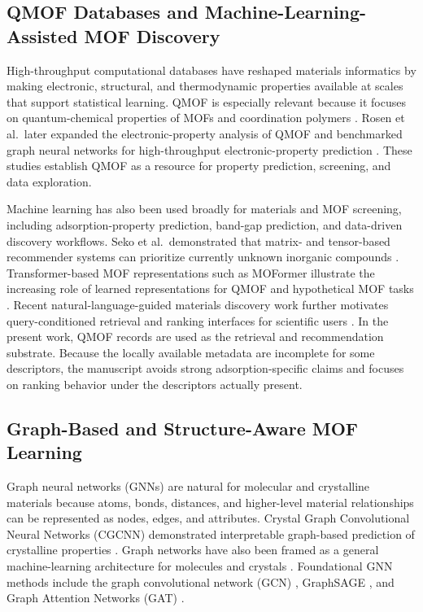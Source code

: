 \documentclass[12pt,a4paper]{article}
\begin{document}
\subsection{QMOF Databases and Machine-Learning-Assisted MOF Discovery}

High-throughput computational databases have reshaped materials informatics by making electronic, structural, and thermodynamic properties available at scales that support statistical learning. QMOF is especially relevant because it focuses on quantum-chemical properties of MOFs and coordination polymers \cite{rosen2021}. Rosen et al.\ later expanded the electronic-property analysis of QMOF and benchmarked graph neural networks for high-throughput electronic-property prediction \cite{rosen2022}. These studies establish QMOF as a resource for property prediction, screening, and data exploration.

Machine learning has also been used broadly for materials and MOF screening, including adsorption-property prediction, band-gap prediction, and data-driven discovery workflows. Seko et al.\ demonstrated that matrix- and tensor-based recommender systems can prioritize currently unknown inorganic compounds \cite{seko2018}. Transformer-based MOF representations such as MOFormer illustrate the increasing role of learned representations for QMOF and hypothetical MOF tasks \cite{luo2023}. Recent natural-language-guided materials discovery work further motivates query-conditioned retrieval and ranking interfaces for scientific users \cite{qu2023}. In the present work, QMOF records are used as the retrieval and recommendation substrate. Because the locally available metadata are incomplete for some descriptors, the manuscript avoids strong adsorption-specific claims and focuses on ranking behavior under the descriptors actually present.

\subsection{Graph-Based and Structure-Aware MOF Learning}

Graph neural networks (GNNs) are natural for molecular and crystalline materials because atoms, bonds, distances, and higher-level material relationships can be represented as nodes, edges, and attributes. Crystal Graph Convolutional Neural Networks (CGCNN) demonstrated interpretable graph-based prediction of crystalline properties \cite{xie2018}. Graph networks have also been framed as a general machine-learning architecture for molecules and crystals \cite{chen2019}. Foundational GNN methods include the graph convolutional network (GCN) \cite{kipf2017}, GraphSAGE \cite{hamilton2017}, and Graph Attention Networks (GAT) \cite{velickovic2018}.
\end{document}
